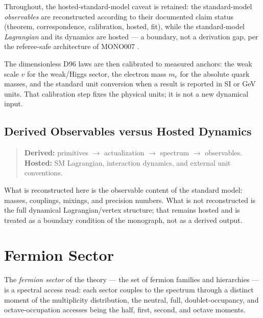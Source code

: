 Throughout, the hosted-standard-model caveat is retained: the standard-model
\emph{observables} are reconstructed according to their documented claim status (theorem,
correspondence, calibration, hosted, fit), while the standard-model \emph{Lagrangian} and
its dynamics are hosted --- a boundary, not a derivation gap, per the referee-safe
architecture of MONO007 \cite{c11:MONO007}.

The dimensionless D96 laws are then calibrated to measured anchors: the weak scale $v$
for the weak/Higgs sector, the electron mass $m_e$ for the absolute quark masses, and the
standard unit conversion when a result is reported in SI or GeV units. That calibration
step fixes the physical units; it is not a new dynamical input.

\subsection{Derived Observables versus Hosted Dynamics}
\label{c11:sec:derived-vs-hosted}

\begin{quote}
\textbf{Derived:} primitives $\rightarrow$ actualization $\rightarrow$ spectrum $\rightarrow$
observables.\\
\textbf{Hosted:} SM Lagrangian, interaction dynamics, and external unit conventions.
\end{quote}

What is reconstructed here is the observable content of the standard model: masses,
couplings, mixings, and precision numbers. What is not reconstructed is the full dynamical
Lagrangian/vertex structure; that remains hosted and is treated as a boundary condition of
the monograph, not as a derived output.

\section{Fermion Sector}
\label{c11:sec:fermion-sector}

\begin{theorem}
\label{c11:thm:fermion-access}
The \emph{fermion sector} of the theory --- the set of fermion families and hierarchies ---
is a spectral access read: each sector couples to the spectrum through a distinct moment of
the multiplicity distribution, the neutral, full, doublet-occupancy, and octave-occupation
accesses being the half, first, second, and octave moments.
\end{theorem}

